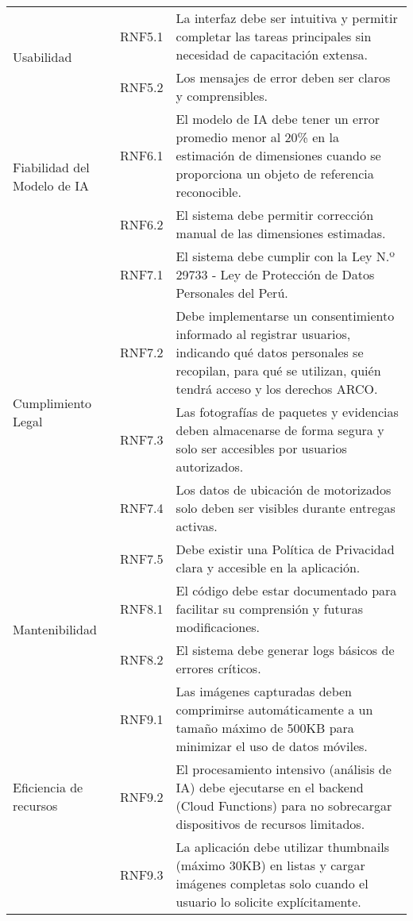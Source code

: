 \begin{longtable}{@{}p{3.5cm}p{1.5cm}p{10cm}@{}}
\multirow{2}{=}{Usabilidad}
& RNF5.1 & La interfaz debe ser intuitiva y permitir completar las tareas principales sin necesidad de capacitación extensa. \\
& RNF5.2 & Los mensajes de error deben ser claros y comprensibles. \\ \midrule

\multirow{2}{=}{Fiabilidad del Modelo de IA}
& RNF6.1 & El modelo de IA debe tener un error promedio menor al 20\% en la estimación de dimensiones cuando se proporciona un objeto de referencia reconocible. \\
& RNF6.2 & El sistema debe permitir corrección manual de las dimensiones estimadas. \\ \midrule

\multirow{5}{=}{Cumplimiento Legal}
& RNF7.1 & El sistema debe cumplir con la Ley N.º 29733 - Ley de Protección de Datos Personales del Perú. \\
& RNF7.2 & Debe implementarse un consentimiento informado al registrar usuarios, indicando qué datos personales se recopilan, para qué se utilizan, quién tendrá acceso y los derechos ARCO. \\
& RNF7.3 & Las fotografías de paquetes y evidencias deben almacenarse de forma segura y solo ser accesibles por usuarios autorizados. \\
& RNF7.4 & Los datos de ubicación de motorizados solo deben ser visibles durante entregas activas. \\
& RNF7.5 & Debe existir una Política de Privacidad clara y accesible en la aplicación. \\ \midrule

\multirow{2}{=}{Mantenibilidad}
& RNF8.1 & El código debe estar documentado para facilitar su comprensión y futuras modificaciones. \\
& RNF8.2 & El sistema debe generar logs básicos de errores críticos. \\ \midrule

\multirow{3}{=}{Eficiencia de recursos}
& RNF9.1 & Las imágenes capturadas deben comprimirse automáticamente a un tamaño máximo de 500KB para minimizar el uso de datos móviles. \\
& RNF9.2 & El procesamiento intensivo (análisis de IA) debe ejecutarse en el backend (Cloud Functions) para no sobrecargar dispositivos de recursos limitados. \\
& RNF9.3 & La aplicación debe utilizar thumbnails (máximo 30KB) en listas y cargar imágenes completas solo cuando el usuario lo solicite explícitamente. \\

\end{longtable}

